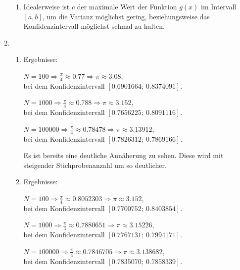 \documentclass[a4paper]{scrartcl}
\def \blattnr {11}
\begin{document}
\begin{enumerate}[label=\bfseries \blattnr.\arabic*]
\begin{enumerate}
     \item %
	 Idealerweise ist $c$ der maximale Wert der Funktion $g(x)$ im Intervall 
	 $[a,b]$, um die Varianz möglichst gering, beziehungsweise das 
	 Konfidenzintervall möglichst schmal zu halten.
     
    \end{enumerate}
  \item %
    \begin{enumerate}
     \item %
         
         
         Ergebnisse:
         
         $N = 100 \Rightarrow \frac\pi4 \approx \num{0.77} \Rightarrow \pi \approx \num{3.08}$, \\
         bei dem Konfidenzintervall $[\num{0.6901664} ;\ \num{0.8374091}]$.
         
         $N = 1000 \Rightarrow \frac\pi4 \approx \num{0.788} \Rightarrow \pi \approx \num{3.152}$, \\
         bei dem Konfidenzintervall $[\num{0.7656225} ;\ \num{0.8091116}]$.

         $N = \num{100000} \Rightarrow \frac\pi4 \approx \num{0.78478} \Rightarrow \pi \approx \num{3.13912}$, \\
         bei dem Konfidenzintervall $[\num{0.7826312} ;\ \num{0.7869166}]$.
         
         Es ist bereits eine deutliche Annäherung zu sehen. Diese wird mit steigender 
         Stichprobenanzahl um so deutlicher.     
     \pagebreak
     \item %
	 
         
         Ergebnisse:
         
         $N = 100 \Rightarrow \frac\pi4 \approx \num{0.8052303} \Rightarrow \pi \approx \num{3.152}$, \\
         bei dem Konfidenzintervall $[\num{0.7700752} ;\ \num{0.8403854}]$.

         $N = 1000 \Rightarrow \frac\pi4 \approx \num{0.7880651} \Rightarrow \pi \approx \num{3.15226}$, \\
         bei dem Konfidenzintervall $[\num{0.7767131} ;\ \num{0.7994171}]$.

         $N = \num{100000} \Rightarrow \frac\pi4 \approx \num{0.7846705} \Rightarrow \pi \approx \num{3.138682}$, \\
         bei dem Konfidenzintervall $[\num{0.7835070} ;\ \num{0.7858339}]$.
         

\end{enumerate}
\end{enumerate}
\end{document}
